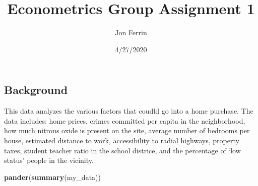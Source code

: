 \documentclass[
]{article}
\title{Econometrics Group Assignment 1}
\author{Jon Ferrin}
\date{4/27/2020}
\newenvironment{Shaded}{\begin{snugshade}}{\end{snugshade}}
\newcommand{\KeywordTok}[1]{\textcolor[rgb]{0.13,0.29,0.53}{\textbf{#1}}}
\newcommand{\NormalTok}[1]{#1}
\begin{document}
\maketitle

\hypertarget{background}{%
\subsection{Background}\label{background}}

This data analyzes the various factors that coudld go into a home
purchase. The data includes: home prices, crimes committed per capita in
the neighborhood, how much nitrous oxide is present on the site, average
number of bedrooms per house, estimated distance to work, accessibility
to radial highways, property taxes, student teacher ratio in the school
districe, and the percentage of `low status' people in the vicinity.

\begin{Shaded}
\begin{Highlighting}[]
\KeywordTok{pander}\NormalTok{(}\KeywordTok{summary}\NormalTok{(my_data))}
\end{Highlighting}
\end{Shaded}
\end{document}
